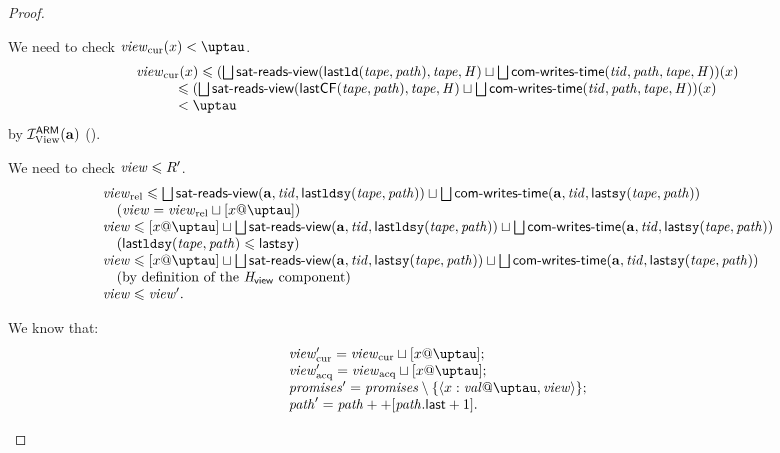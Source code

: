 \begin{proof}
\begin{itemize}
    We need to check $\Rcur(x) < \tau$.
    \[\begin{array}{l}
  \Rcur(x) \le (\bigsqcup \readsSatisfiedR(\lastLD(\tape, \cpath), \tape, \hmap) \sqcup \bigsqcup \opstau(\tId, \cpath, \tape, \hmap))(x) \\
  \quad \quad \quad \le (\bigsqcup \readsSatisfiedR(\lastCF(\tape, \cpath), \tape, \hmap) \sqcup \bigsqcup \opstau(\tId, \cpath, \tape, \hmap))(x) \\
  \quad \quad \quad < \tau\\
    \end{array}\]
  by $\mathcal{I}^\mathsf{ARM}_{\textup{\rm {View}}}(\mathbf{a})$ (\app{\ref{thm:invAview}}).
  
    We need to check $\mathit{view} \leqslant R'$.
    \[\begin{array}{l}
  \Rrel \le \bigsqcup \readsSatisfiedR(\aT, \tId, \lastLDSY(\tape, \cpath)) \sqcup \bigsqcup \opstau(\aT, \tId, \lastSY(\tape, \cpath)) \\
  \quad (\R = \Rrel \sqcup [x@\tau]) \\
  \R \le [x@\tau] \sqcup \bigsqcup \readsSatisfiedR(\aT, \tId, \lastLDSY(\tape, \cpath)) \sqcup \bigsqcup \opstau(\aT, \tId, \lastSY(\tape, \cpath)) \\
  \quad (\lastLDSY(\tape, \cpath) \le \lastSY) \\
  \R \le [x@\tau] \sqcup \bigsqcup \readsSatisfiedR(\aT, \tId, \lastSY  (\tape, \cpath)) \sqcup \bigsqcup \opstau(\aT, \tId, \lastSY(\tape, \cpath)) \\
  \quad (\text{by definition of the $\rmap$ component}) \\
  \R \le \R'.
    \end{array}\]

We know that:
    \[\begin{array}{l}
\Rcur' = \Rcur \sqcup [x@\tau];\\
\Racq' = \Racq \sqcup [x@\tau];\\
\PromSet' = \PromSet \setminus \{ \writeEvt{x}{\stval}{\tau}{\R} \};\\
\cpath' = \cpath ++ [\lastInstr{\cpath} + 1].
    \end{array}\]


\end{itemize}
\end{proof}
